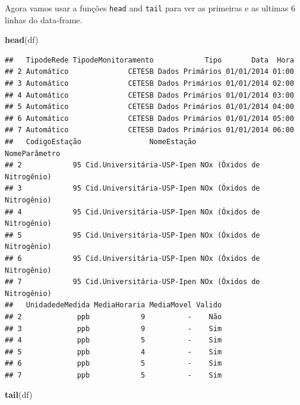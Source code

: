 \documentclass[]{book}
\newenvironment{Shaded}{\begin{snugshade}}{\end{snugshade}}
\newcommand{\KeywordTok}[1]{\textcolor[rgb]{0.13,0.29,0.53}{\textbf{#1}}}
\newcommand{\NormalTok}[1]{#1}
\begin{document}
Agora vamos usar a funções \texttt{head} and \texttt{tail} para ver as
primeiras e as ultimas 6 linhas do data-frame.

\begin{Shaded}
\begin{Highlighting}[]
\KeywordTok{head}\NormalTok{(df)}
\end{Highlighting}
\end{Shaded}

\begin{verbatim}
##   TipodeRede TipodeMonitoramento            Tipo       Data  Hora
## 2 Automático              CETESB Dados Primários 01/01/2014 01:00
## 3 Automático              CETESB Dados Primários 01/01/2014 02:00
## 4 Automático              CETESB Dados Primários 01/01/2014 03:00
## 5 Automático              CETESB Dados Primários 01/01/2014 04:00
## 6 Automático              CETESB Dados Primários 01/01/2014 05:00
## 7 Automático              CETESB Dados Primários 01/01/2014 06:00
##   CodigoEstação                NomeEstação              NomeParâmetro
## 2            95 Cid.Universitária-USP-Ipen NOx (Óxidos de Nitrogênio)
## 3            95 Cid.Universitária-USP-Ipen NOx (Óxidos de Nitrogênio)
## 4            95 Cid.Universitária-USP-Ipen NOx (Óxidos de Nitrogênio)
## 5            95 Cid.Universitária-USP-Ipen NOx (Óxidos de Nitrogênio)
## 6            95 Cid.Universitária-USP-Ipen NOx (Óxidos de Nitrogênio)
## 7            95 Cid.Universitária-USP-Ipen NOx (Óxidos de Nitrogênio)
##   UnidadedeMedida MediaHoraria MediaMovel Valido
## 2             ppb            9          -    Não
## 3             ppb            9          -    Sim
## 4             ppb            5          -    Sim
## 5             ppb            4          -    Sim
## 6             ppb            5          -    Sim
## 7             ppb            5          -    Sim
\end{verbatim}

\begin{Shaded}
\begin{Highlighting}[]
\KeywordTok{tail}\NormalTok{(df)}
\end{Highlighting}
\end{Shaded}
\end{document}
